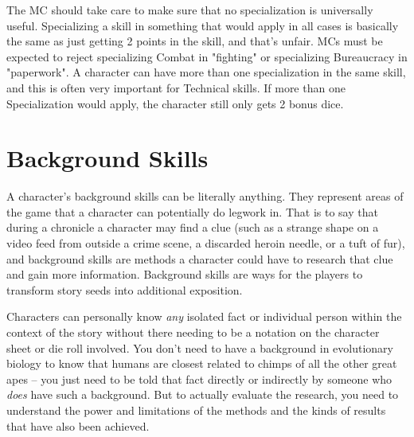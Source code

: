 The MC should take care to make sure that no specialization is universally useful. Specializing a skill in something that would apply in all cases is basically the same as just getting 2 points in the skill, and that's unfair. MCs must be expected to reject specializing Combat in "fighting" or specializing Bureaucracy in "paperwork". A character can have more than one specialization in the same skill, and this is often very important for Technical skills. If more than one Specialization would apply, the character still only gets 2 bonus dice.

\section{Background Skills}

A character's background skills can be literally anything. They represent areas of the game that a character can potentially do legwork in. That is to say that during a chronicle a character may find a clue (such as a strange shape on a video feed from outside a crime scene, a discarded heroin needle, or a tuft of fur), and background skills are methods a character could have to research that clue and gain more information. Background skills are ways for the players to transform story seeds into additional exposition.

Characters can personally know \textit{any} isolated fact or individual person within the context of the story without there needing to be a notation on the character sheet or die roll involved. You don't need to have a background in evolutionary biology to know that humans are closest related to chimps of all the other great apes -- you just need to be told that fact directly or indirectly by someone who \textit{does} have such a background. But to actually evaluate the research, you need to understand the power and limitations of the methods and the kinds of results that have also been achieved. 


